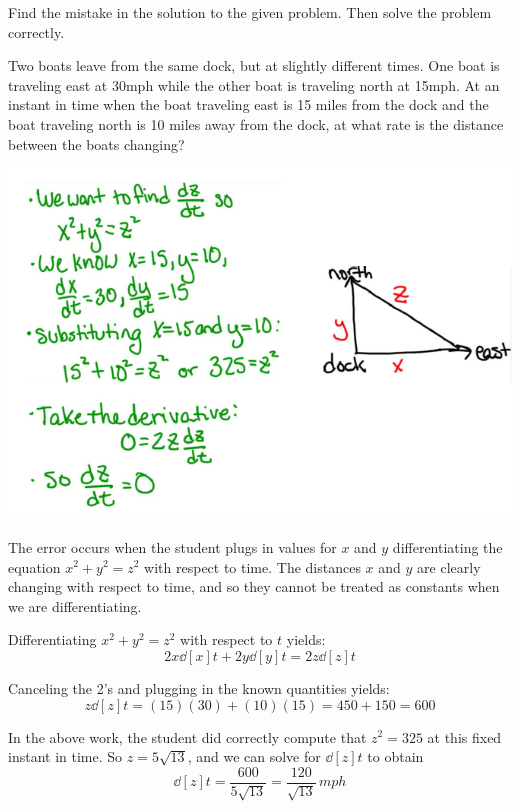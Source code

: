 \documentclass[nooutcomes]{ximera}
\begin{document}
\begin{problem}
Find the mistake in the solution to the given problem.  Then solve the problem correctly.

Two boats leave from the same dock, but at slightly different times.  One boat is traveling east at 30mph while the other boat is traveling north at 15mph.  At an instant in time when the boat traveling east is 15 miles from the dock and the boat traveling north is 10 miles away from the dock, at what rate is the distance between the boats changing?
	\begin{image}
	\includegraphics[scale=.7]{Figure1.png}
	\end{image}
	
		\begin{freeResponse} 
		The error occurs when the student plugs in values for $x$ and $y$  differentiating the equation $x^2 + y^2 = z^2$ with respect to time.  The distances $x$ and $y$ are clearly changing with respect to time, and so they cannot be treated as constants when we are differentiating.
		
		Differentiating $x^2 + y^2 = z^2$ with respect to $t$ yields:
		$$ 2x \dd[x]{t} + 2y \dd[y]{t} = 2z \dd[z]{t}$$
		
		Canceling the 2's and plugging in the known quantities yields:
		$$ z \dd[z]{t} = (15)(30) + (10)(15) = 450 + 150 = 600 $$
		
		In the above work, the student did correctly compute that $z^2 = 325$ at this fixed instant in time.  So $z = 5\sqrt{13}$, and we can solve for $\dd[z]{t}$ to obtain
		$$ \dd[z]{t} = \frac{600}{5 \sqrt{13}} = \frac{120}{\sqrt{13}} \, mph $$
		\end{freeResponse}	

\end{problem}
\end{document}
